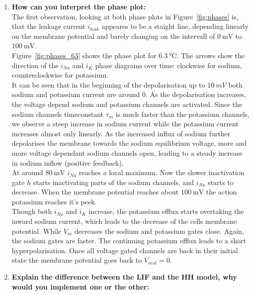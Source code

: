 \documentclass{scrartcl}			%
\begin{document}
\begin{enumerate}
\item \textbf{How can you interpret the phase plot:}\\

The first observation, looking at both phase plots in Figure~\ref{fig:phases} is, that the leakage current $i_{leak}$ appeares to be a staight line, depending linearly on the membrane potential and barely changing on the intervall of $\SI{0}{\milli\volt}$ to $\SI{100}{\milli\volt}$.\\
Figure~\ref{fig:phases_63} shows the phase plot for $\SI{6.3}{\celsius}$. The arrows show the direction of the $i_{Na}$ and $i_{K}$ phase diagrams over time: clockwise for sodium, counterclockwise for potassium.\\ It can be seen that in the beginning of the depolarisation up to $\SI{10}{mV}$ both sodium and potassium current are around $0$. As the depolarisation increases, the voltage depend sodium and potassium channels are activated. Since the sodium channels timeconstant $\tau_m$ is much faster than the potassium channels, we observe a steep increase in sodium current while the potassium current increases almost only linearly. As the increased influx of sodium further depolarises the membrane towards the sodium equilibrium voltage, more and more voltage dependant sodium channels open, leading to a steady increase in sodium inflow (positive feedback).\\ At around $\SI{80}{\milli\volt}$ $i_{Na}$ reaches a local maximum. Now the slower inactivation gate $h$ starts inactivating parts of the sodium channels, and $i_{Na}$ starts to decrease. When the membrane potential reaches about $\SI{100}{\milli\volt}$ the action potassium reaches it's peek.\\ Though both $i_{Na}$ and $i_{K}$ increase, the potassium efflux starts overtaking the inward sodium current, which leads to the decrease of the cells membrane potential. While $V_m$ decreases the sodium and potassium gates close. Again, the sodium gates are faster. The continuing potassium efflux leads to a short hyperpolarisation. Once all voltage gated channels are back in their initial state the membrane potential goes back to $V_{rest}=0$.

\item \textbf{Explain the difference between the LIF and the HH model, why would you implement one or the other:}\\


\end{enumerate}
\end{document}
